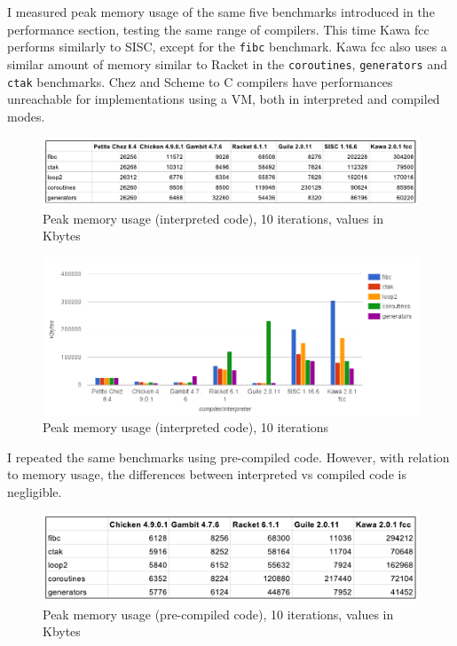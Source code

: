 \documentclass[12pt,a4paper,oneside,openright]{book}
\begin{document}
I measured peak memory usage of the same five benchmarks introduced in
the performance section, testing the same range of compilers. This time
Kawa fcc performs similarly to SISC, except for the \texttt{fibc}
benchmark. Kawa fcc also uses a similar amount of memory similar to
Racket in the \texttt{coroutines}, \texttt{generators} and \texttt{ctak}
benchmarks. Chez and Scheme to C compilers have performances unreachable
for implementations using a VM, both in interpreted and compiled modes.

\begin{figure}[htbp]
\centering
\includegraphics{figures/mem-interpreted-table.pdf}
\caption{Peak memory usage (interpreted code), 10 iterations, values in
Kbytes \label{interp-tab}}
\end{figure}

\begin{figure}[htbp]
\centering
\includegraphics{figures/mem-interpreted.png}
\caption{Peak memory usage (interpreted code), 10 iterations
\label{interp}}
\end{figure}

I repeated the same benchmarks using pre-compiled code. However, with
relation to memory usage, the differences between interpreted vs
compiled code is negligible.

\begin{figure}[htbp]
\centering
\includegraphics{figures/mem-compiled-table.pdf}
\caption{Peak memory usage (pre-compiled code), 10 iterations, values in
Kbytes \label{compiled-tab}}
\end{figure}
\end{document}
